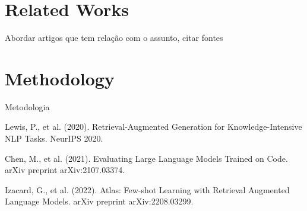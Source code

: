 \documentclass[a4paper,12pt]{article}
\begin{document}
\section{Related Works}
Abordar artigos que tem relação com o assunto, citar fontes

\section{Methodology}
Metodologia

\begin{thebibliography}{99}
     Lewis, P., et al. (2020). Retrieval-Augmented Generation for Knowledge-Intensive NLP Tasks. NeurIPS 2020.
    
     Chen, M., et al. (2021). Evaluating Large Language Models Trained on Code. arXiv preprint arXiv:2107.03374.
    
     Izacard, G., et al. (2022). Atlas: Few-shot Learning with Retrieval Augmented Language Models. arXiv preprint arXiv:2208.03299.
    
\end{thebibliography}
\end{document}
